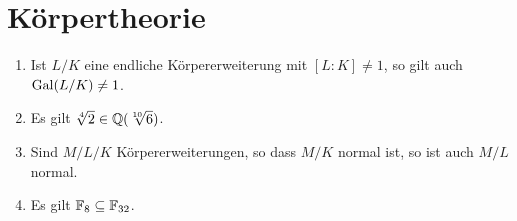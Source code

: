 \section{Körpertheorie}


\begin{question}[subtitle = Multiple Choice]
  \begin{enumerate}
    \item
      Ist $L/K$ eine endliche Körpererweiterung mit $[L : K] \neq 1$, so gilt auch $\operatorname{Gal}(L/K) \neq 1$.
    \item
      Es gilt $\sqrt[4]{2} \in \mathbb{Q}(\sqrt[10]{6})$.
    \item
      Sind $M/L/K$ Körpererweiterungen, so dass $M/K$ normal ist, so ist auch $M/L$ normal.
    \item
      Es gilt $\mathbb{F}_{8} \subseteq \mathbb{F}_{32}$.
  \end{enumerate}
\end{question}


